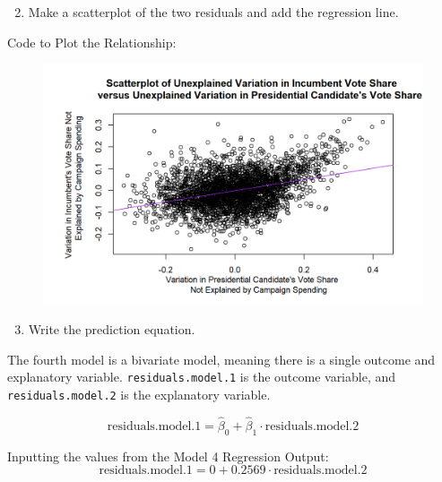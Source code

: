 \documentclass[12pt,letterpaper]{article}
\begin{document}
\newpage
\noindent\begin{enumerate}[left=0pt]
\setcounter{enumi}{1}	
\item Make a scatterplot of the two residuals and add the regression line.
\end{enumerate}		
\vspace{0.25cm}\noindent Code to Plot the Relationship:

\begin{figure}[H]
	\centering
	\includegraphics[width=1\textwidth]{Figure_4_1.png}
\end{figure} 
\newpage
\noindent\begin{enumerate}[left=0pt]
\setcounter{enumi}{2}			
\item Write the prediction equation.
\end{enumerate}
\vspace{0.25cm}
\noindent The fourth model is a bivariate model, meaning there is a single outcome and explanatory variable. \texttt{residuals.model.1} is the outcome variable, and \texttt{residuals.model.2} is the explanatory variable.

\begin{equation}
	\text{residuals.model.1} = \hat{\beta}_0 + \hat{\beta}_1 \cdot \text{residuals.model.2}
\end{equation}

\vspace{0.5cm} \noindent Inputting the values from the Model 4 Regression Output:
\begin{equation}
	\text{residuals.model.1} = 0 + 0.2569 \cdot \text{residuals.model.2}
\end{equation}

	
	\newpage	
\end{document}
